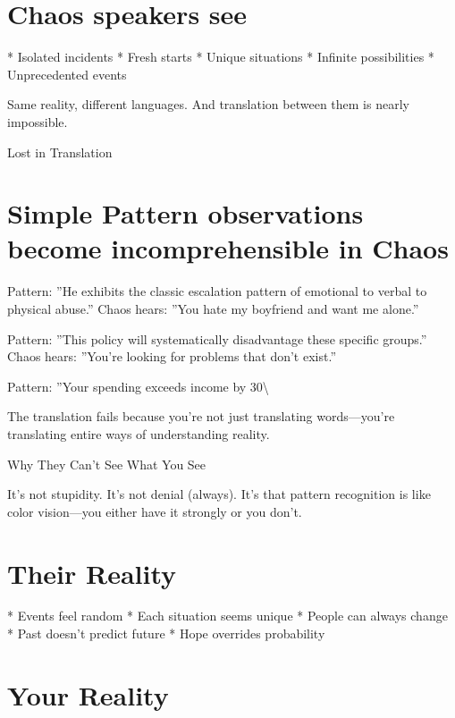 \documentclass[12pt,oneside]{book}
\begin{document}
\section{Chaos speakers see}

                    * Isolated incidents
                    * Fresh starts
                    * Unique situations
                    * Infinite possibilities
                    * Unprecedented events

Same reality, different languages. And translation between them is nearly impossible.

Lost in Translation

\section{Simple Pattern observations become incomprehensible in Chaos}

Pattern: ''He exhibits the classic escalation pattern of emotional to verbal to physical abuse.'' Chaos hears: ''You hate my boyfriend and want me alone.''

Pattern: ''This policy will systematically disadvantage these specific groups.'' Chaos hears: ''You're looking for problems that don't exist.''

Pattern: ''Your spending exceeds income by 30\textbackslash{}%

The translation fails because you're not just translating words---you're translating entire ways of understanding reality.

Why They Can't See What You See

It's not stupidity. It's not denial (always). It's that pattern recognition is like color vision---you either have it strongly or you don't.

\section{Their Reality}

                    * Events feel random
                    * Each situation seems unique
                    * People can always change
                    * Past doesn't predict future
                    * Hope overrides probability

\section{Your Reality}
\end{document}
